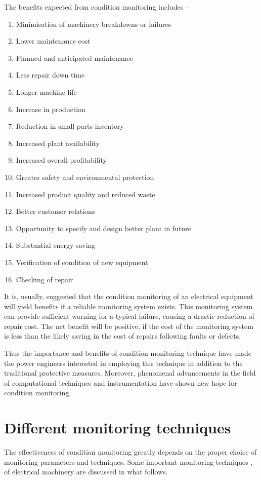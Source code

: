 \documentclass[a4paper,11pt]{report}
\begin{document}
The benefits expected from condition monitoring includes --
\begin{enumerate}
\item Minimisation of machinery breakdowns or failures
\item Lower maintenance cost
\item Planned and anticipated maintenance
\item Less repair down time
\item Longer machine life
\item Increase in production
\item Reduction in small parts inventory
\item Increased plant availability
\item Increased overall profitability
\item Greater safety and environmental protection
\item Increased product quality and reduced waste
\item Better customer relations
\item Opportunity to specify and design better plant in future
\item Substantial energy saving
\item Verification of condition of new equipment
\item Checking of repair
\end{enumerate}

It is, usually, suggested that the condition monitoring of an electrical equipment will yield benefits if a reliable monitoring system exists. This monitoring system can provide sufficient warning for a typical failure, causing a drastic reduction of repair cost. The net benefit will be positive, if the cost of the monitoring system is less than the likely saving in the cost of repairs following faults or defects.

Thus the importance and benefits of condition monitoring technique have made the power engineers interested in employing this technique in addition to the traditional protective measures. Moreover, phenomenal advancements in the field of computational techniques and instrumentation have shown new hope for condition monitoring.

\section{Different monitoring techniques}
The effectiveness of condition monitoring greatly depends on the proper choice of monitoring parameters and techniques. Some important monitoring techniques \cite{Penman},\cite{rps1} of electrical machinery are discussed in what follows.
\end{document}
